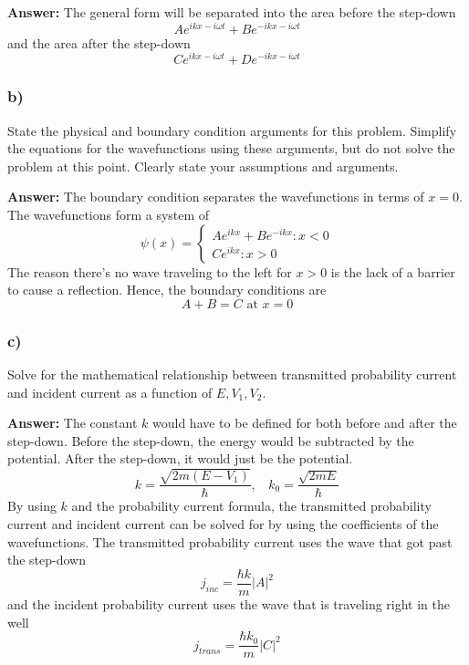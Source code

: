 \documentclass[10pt,letterpaper]{article}
\begin{document}
\textbf{Answer: }The general form will be separated into the area before the step-down
$$Ae^{ikx - i\omega t} + Be^{-ikx - i\omega t}$$
and the area after the step-down
$$Ce^{ikx - i\omega t} + De^{-ikx - i\omega t}$$
\subsubsection*{b)}
\noindent  State the physical and boundary condition arguments for this problem. Simplify the equations for the wavefunctions using these arguments, but do not solve the problem at this point. Clearly state your assumptions and arguments.

\textbf{Answer: }The boundary condition separates the wavefunctions in terms of $x = 0$. The wavefunctions form a system of
$$\psi(x) = \begin{cases}
Ae^{ikx} + Be^{-ikx} : x < 0\\
Ce^{ikx} : x > 0
\end{cases}$$
The reason there's no wave traveling to the left for $x > 0$ is the lack of a barrier to cause a reflection. Hence, the boundary conditions are
$$A + B = C \text{    at    } x = 0$$
\subsubsection*{c)}
\noindent Solve for the mathematical relationship between transmitted probability current and incident current as a function of $E, V_{1}, V_{2}$.

\textbf{Answer: }The constant $k$ would have to be defined for both before and after the step-down. Before the step-down, the energy would be subtracted by the potential. After the step-down, it would just be the potential.
$$k = \frac{\sqrt{2m(E - V_{1})}}{\hbar},\ \ \ \ k_{0} = \frac{\sqrt{2mE}}{\hbar}$$
By using $k$ and the probability current formula, the transmitted probability current and incident current can be solved for by using the coefficients of the wavefunctions. The transmitted probability current uses the wave that got past the step-down 
$$j_{inc} = \frac{\hbar k}{m}|A|^{2}$$
and the incident probability current uses the wave that is traveling right in the well
$$j_{trans} = \frac{\hbar k_{0}}{m}|C|^{2}$$
\end{document}

